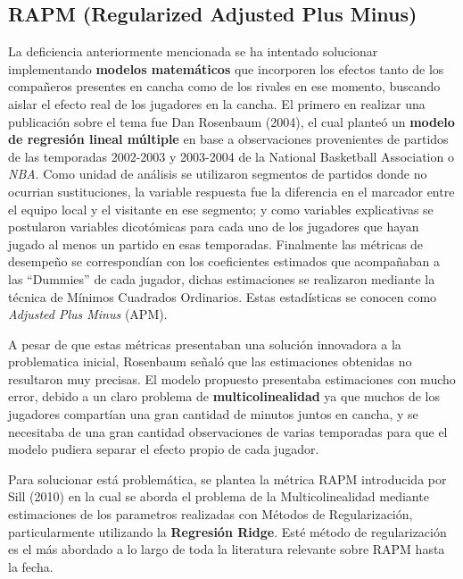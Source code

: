 \documentclass[
]{article}
\begin{document}
\subsection{RAPM (Regularized Adjusted Plus
Minus)}\label{rapm-regularized-adjusted-plus-minus}

La deficiencia anteriormente mencionada se ha intentado solucionar
implementando \textbf{modelos matemáticos} que incorporen los efectos
tanto de los compañeros presentes en cancha como de los rivales en ese
momento, buscando aislar el efecto real de los jugadores en la cancha.
El primero en realizar una publicación sobre el tema fue Dan Rosenbaum
(2004), el cual planteó un \textbf{modelo de regresión lineal múltiple}
en base a observaciones provenientes de partidos de las temporadas
2002-2003 y 2003-2004 de la National Basketball Association o
\emph{NBA}. Como unidad de análisis se utilizaron segmentos de partidos
donde no ocurrian sustituciones, la variable respuesta fue la diferencia
en el marcador entre el equipo local y el visitante en ese segmento; y
como variables explicativas se postularon variables dicotómicas para
cada uno de los jugadores que hayan jugado al menos un partido en esas
temporadas. Finalmente las métricas de desempeño se correspondían con
los coeficientes estimados que acompañaban a las ``Dummies'' de cada
jugador, dichas estimaciones se realizaron mediante la técnica de
Mínimos Cuadrados Ordinarios. Estas estadísticas se conocen como
\emph{Adjusted Plus Minus} (APM).

A pesar de que estas métricas presentaban una solución innovadora a la
problematica inicial, Rosenbaum señaló que las estimaciones obtenidas no
resultaron muy precisas. El modelo propuesto presentaba estimaciones con
mucho error, debido a un claro problema de \textbf{multicolinealidad} ya
que muchos de los jugadores compartían una gran cantidad de minutos
juntos en cancha, y se necesitaba de una gran cantidad observaciones de
varias temporadas para que el modelo pudiera separar el efecto propio de
cada jugador.

Para solucionar está problemática, se plantea la métrica RAPM
introducida por Sill (2010) en la cual se aborda el problema de la
Multicolinealidad mediante estimaciones de los parametros realizadas con
Métodos de Regularización, particularmente utilizando la
\textbf{Regresión Ridge}. Esté método de regularización es el más
abordado a lo largo de toda la literatura relevante sobre RAPM hasta la
fecha.
\end{document}
